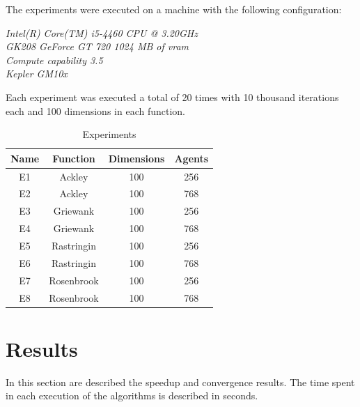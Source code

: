 \documentclass[conference]{IEEEtran}
\begin{document}
The experiments were executed on a machine with the following configuration:

\textit{Intel(R) Core(TM) i5-4460  CPU @ 3.20GHz \\ GK208 GeForce GT 720 1024 MB of vram \\ Compute capability 3.5 \\ Kepler GM10x}

Each experiment was executed a total of 20 times with 10 thousand
iterations each and 100 dimensions in each function.

\begin{table}[!htbp]
    \renewcommand{\arraystretch}{1.3}
    \caption{Experiments}
    \label{experiments}
    \centering
    \begin{tabular}{c|c|c|c}
    \hline
        \bf Name & Function &  Dimensions & Agents\\
    \hline
        E1 & Ackley & 100 & 256\\
        E2 & Ackley & 100 & 768\\
        E3 & Griewank & 100 & 256\\
        E4 & Griewank & 100 & 768\\
        E5 & Rastringin & 100 & 256\\
        E6 & Rastringin & 100 & 768\\
        E7 & Rosenbrook & 100 & 256\\
        E8 & Rosenbrook & 100 & 768\\
    \end{tabular}
\end{table}


\section{Results} \label{results}%

In this section are described the speedup and convergence results. The
time spent in each execution of the algorithms is described in seconds.

\end{document}
